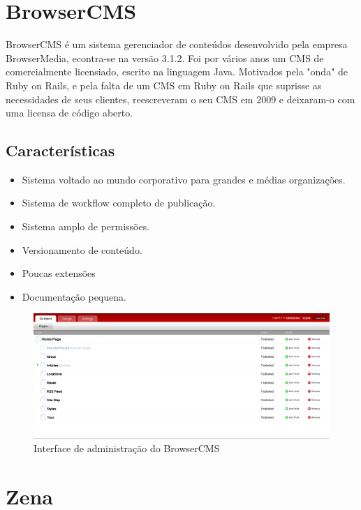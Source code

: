 \section{BrowserCMS}

BrowserCMS é um sistema gerenciador de conteúdos desenvolvido pela empresa BrowserMedia, econtra-se na versão 3.1.2. Foi por vários anos um CMS de comercialmente licensiado, escrito na linguagem Java. Motivados pela "onda" de Ruby on Rails, e pela falta de um CMS em Ruby on Rails que suprisse as necessidades de seus clientes, reescreveram o seu CMS em 2009 e deixaram-o com uma licensa de código aberto.

\subsection{Características}

\begin{itemize}
  \item Sistema voltado ao mundo corporativo para grandes e médias organizações.
  \item Sistema de workflow completo de publicação.
  \item Sistema amplo de permissões.
  \item Versionamento de conteúdo.
  \item Poucas extensões 
  \item Documentação pequena.
\end{itemize}

\begin{figure}[here]
\includegraphics[width=150mm]{images/radiant_admin.png}
\caption{Interface de administração do BrowserCMS}
\label{fig:browsercms_admin.png}
\end{figure}


\section{Zena}


